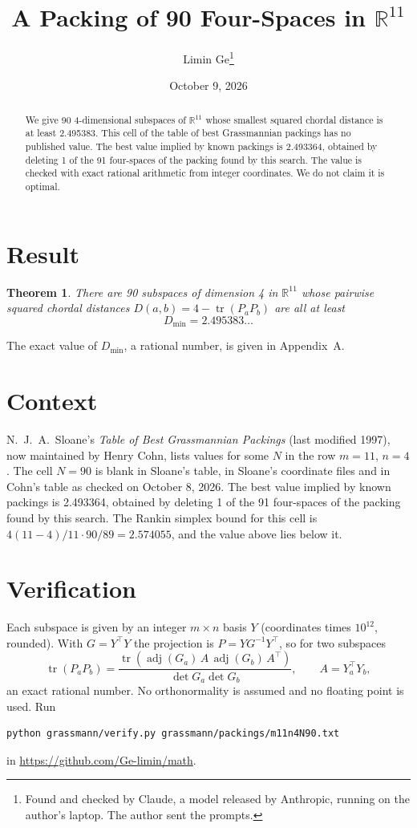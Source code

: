 \documentclass[11pt,a4paper]{article}
\title{A Packing of 90 Four-Spaces in $\mathbb{R}^{11}$}
\author{Limin Ge\thanks{Found and checked by Claude, a model released by Anthropic, running on the author's laptop. The author sent the prompts.}}
\date{October 9, 2026}
\newtheorem*{theorem}{Theorem}
\begin{document}
\maketitle
\begin{abstract}
We give 90 4-dimensional subspaces of $\mathbb{R}^{11}$ whose smallest squared chordal distance is at least 2.495383. This cell of the table of best Grassmannian packings has no published value. The best value implied by known packings is 2.493364, obtained by deleting 1 of the 91 four-spaces of the packing found by this search. The value is checked with exact rational arithmetic from integer coordinates. We do not claim it is optimal.
\end{abstract}

\section{Result}
\begin{theorem}
There are 90 subspaces of dimension 4 in $\mathbb{R}^{11}$ whose pairwise squared chordal distances $D(a,b) = 4 - \operatorname{tr}(P_aP_b)$ are all at least
\[ D_{\min} = 2.495383\ldots \]
\end{theorem}
The exact value of $D_{\min}$, a rational number, is given in Appendix~A.


\section{Context}
N.~J.~A.~Sloane's \emph{Table of Best Grassmannian Packings} (last modified 1997), now maintained by Henry Cohn, lists values for some $N$ in the row $m=11$, $n=4$. The cell $N=90$ is blank in Sloane's table, in Sloane's coordinate files and in Cohn's table as checked on October 8, 2026. The best value implied by known packings is 2.493364, obtained by deleting 1 of the 91 four-spaces of the packing found by this search. The Rankin simplex bound for this cell is $4(11-4)/11\cdot 90/89 = 2.574055$, and the value above lies below it.


\section{Verification}
Each subspace is given by an integer $m\times n$ basis $Y$ (coordinates times $10^{12}$, rounded). With $G=Y^\top Y$ the projection is $P=YG^{-1}Y^\top$, so for two subspaces
\[ \operatorname{tr}(P_aP_b)=\frac{\operatorname{tr}(\operatorname{adj}(G_a)\,A\,\operatorname{adj}(G_b)\,A^\top)}{\det G_a\det G_b},\qquad A=Y_a^\top Y_b, \]
an exact rational number. No orthonormality is assumed and no floating point is used. Run
\begin{verbatim}
python grassmann/verify.py grassmann/packings/m11n4N90.txt
\end{verbatim}
in \url{https://github.com/Ge-limin/math}.
\end{document}
